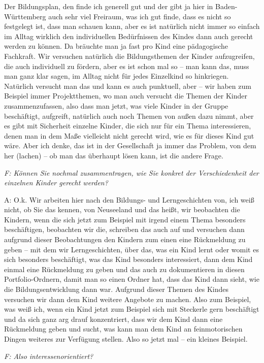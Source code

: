 \begin{linenumbers*}
Der Bildungsplan, den finde ich generell gut und der gibt ja hier in Baden-Württemberg auch sehr viel Freiraum, was ich gut finde, dass es nicht so festgelegt ist, dass man schauen kann, aber es ist natürlich nicht immer so einfach im Alltag wirklich den individuellen Bedürfnissen des Kindes dann auch gerecht werden zu können. Da bräuchte man ja fast pro Kind eine pädagogische Fachkraft. Wir versuchen natürlich die Bildungsthemen der Kinder aufzugreifen, die auch individuell zu fördern, aber es ist schon mal so – man kann das, muss man ganz klar sagen, im Alltag nicht für jedes Einzelkind so hinkriegen. Natürlich versucht man das und kann es auch punktuell, aber – wir haben zum Beispiel immer Projektthemen, wo man auch versucht die Themen der Kinder zusammenzufassen, also dass man jetzt, was viele Kinder in der Gruppe beschäftigt, aufgreift, natürlich auch noch Themen von außen dazu nimmt, aber es gibt mit Sicherheit einzelne Kinder, die sich nur für ein Thema interessieren, denen man in dem Maße vielleicht nicht gerecht wird, wie es für dieses Kind gut wäre.  
Aber ich denke, das ist in der Gesellschaft ja immer das Problem, von dem her (lachen) – ob man das überhaupt lösen kann, ist die andere Frage.

\emph{F: Können Sie nochmal zusammentragen, wie Sie konkret der Verschiedenheit der einzelnen Kinder gerecht werden?}

A: O.k. Wir arbeiten hier nach den Bildungs- und Lerngeschichten von, ich weiß nicht, ob Sie das kennen, von Neuseeland und das heißt, wir beobachten die Kindern, wenn die sich jetzt zum Beispiel mit irgend einem Thema besonders beschäftigen, beobachten wir die, schreiben das auch auf und versuchen dann aufgrund dieser Beobachtungen den Kindern zum einen eine Rückmeldung zu geben – mit dem wir Lerngeschichten, über das, was ein Kind lernt oder womit es sich besonders beschäftigt, was das Kind besonders interessiert, dann dem Kind einmal eine Rückmeldung zu geben und das auch zu dokumentieren in diesen Portfolio-Ordnern, damit man so einen Ordner hat, dass das Kind dann sieht, wie die Bildungsentwicklung dann war. Aufgrund dieser Themen des Kindes versuchen wir dann dem Kind weitere Angebote zu machen. Also zum Beispiel, was weiß ich, wenn ein Kind jetzt zum Beispiel sich mit Steckerle gern beschäftigt und da sich ganz arg drauf konzentriert, dass wir dem Kind dann eine Rückmeldung geben und sucht, was kann man dem Kind an feinmotorischen Dingen weiteres zur Verfügung stellen. Also so jetzt mal -- ein kleines Beispiel.

\emph{F: Also interessenorientiert?}


\end{linenumbers*}

